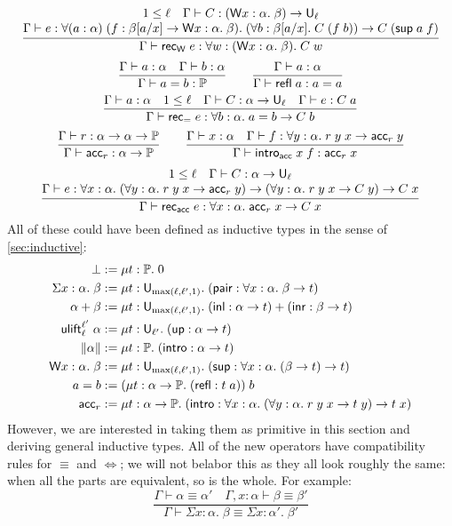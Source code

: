 $$\frac{\begin{matrix}
1\le\ell\quad \Gamma\vdash C:(\W x:\alpha.\;\beta)\to\U_\ell\\
\Gamma\vdash e:\forall (a:\alpha)\;(f:\beta[a/x]\to\W x:\alpha.\;\beta).\;(\forall b:\beta[a/x].\;C\;(f\;b))\to C\;(\sup a\;f)
\end{matrix}}{\Gamma\vdash \rec_\W\;e:\forall w:(\W x:\alpha.\;\beta).\;C\;w}$$
$$\frac{\Gamma\vdash a:\alpha\quad\Gamma\vdash b:\alpha}
{\Gamma\vdash a=b:\P}\qquad
\frac{\Gamma\vdash a:\alpha}{\Gamma\vdash \refl\;a:a=a}$$
$$\frac{\Gamma\vdash a:\alpha\quad 1\le\ell\quad \Gamma\vdash C:\alpha\to\U_\ell\quad\Gamma\vdash e:C\;a}{\Gamma\vdash \rec_=\;e:\forall b:\alpha.\;a=b\to C\;b}$$
$$\frac{\Gamma\vdash r:\alpha\to\alpha\to\P}{\Gamma\vdash \acc_r:\alpha\to\P}\qquad
\frac{\Gamma\vdash x:\alpha\quad\Gamma\vdash f:\forall y:\alpha.\;r\;y\;x\to\acc_r\;y}{\Gamma\vdash \intro_\acc\;x\;f:\acc_r\;x}$$
$$\frac{\begin{matrix}
1\le\ell\quad \Gamma\vdash C:\alpha\to\U_\ell\\
\Gamma\vdash e:\forall x:\alpha.\; (\forall y:\alpha.\;r\;y\;x\to\acc_r\;y)\to (\forall y:\alpha.\;r\;y\;x\to C\;y)\to C\;x
\end{matrix}}{\Gamma\vdash \rec_\acc\;e:\forall x:\alpha.\;\acc_r\;x\to C\;x}$$
All of these could have been defined as inductive types in the sense of \autoref{sec:inductive}:
\begin{align*}
\bot&:=\mu t:\P.\;0\\
\Sigma x:\alpha.\;\beta&:=\mu t:\U_{\max(\ell,\ell',1)}.\;(\mathsf{pair}:\forall x:\alpha.\;\beta\to t)\\
\alpha+\beta&:=\mu t:\U_{\max(\ell,\ell',1)}.\;(\mathsf{inl}:\alpha\to t)+(\mathsf{inr}:\beta\to t)\\
\ulift_{\ell}^{\ell'}\;\alpha&:=\mu t:\U_{\ell'}.\;(\mathsf{up}:\alpha\to t)\\
\|\alpha\|&:=\mu t:\P.\;(\intro:\alpha\to t)\\
\W x:\alpha.\;\beta&:=\mu t:\U_{\max(\ell,\ell',1)}.\;(\mathsf{sup}:\forall x:\alpha.\;(\beta\to t)\to t)\\
a=b&:=(\mu t:\alpha\to\P.\;(\refl:t\;a))\;b\\
\acc_r&:=\mu t:\alpha\to\P.\;(\intro:\forall x:\alpha.\;(\forall y:\alpha.\;r\;y\;x\to t\;y)\to t\;x)
\end{align*}
However, we are interested in taking them as primitive in this section and deriving general inductive types. All of the new operators have compatibility rules for $\equiv$ and $\Leftrightarrow$; we will not belabor this as they all look roughly the same: when all the parts are equivalent, so is the whole. For example:
$$\frac{\Gamma\vdash\alpha\equiv\alpha'\quad\Gamma,x:\alpha\vdash\beta\equiv\beta'}{\Gamma\vdash\Sigma x:\alpha.\;\beta\equiv\Sigma x:\alpha'.\;\beta'}$$

